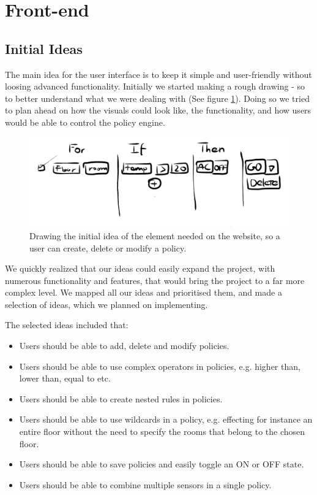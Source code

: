 \section{Front-end}
\label{sec:front-end}
\subsection{Initial Ideas}

The main idea for the user interface is to keep it simple and user-friendly without loosing advanced functionality. Initially we started making a rough drawing - so to better understand what we were dealing with (See figure \ref{fig:initial_idea_frontend}). Doing so we tried to plan ahead on how the visuals could look like, the functionality, and how users would be able to control the policy engine.

\begin{figure}[h!]
\centering
\includegraphics[width=\columnwidth]{initial_idea_frontend.png}
\caption{Drawing the initial idea of the element needed on the website, so a user can create, delete or modify a policy.}
\label{fig:initial_idea_frontend}
\end{figure}

We quickly realized that our ideas could easily expand the project, with numerous functionality and features, that would bring the project to a far more complex level.
We mapped all our ideas and prioritised them, and made a selection of ideas, which we planned on implementing.

The selected ideas included that:
\begin{itemize}
\item Users should be able to add, delete and modify policies.
\item Users should be able to use complex operators in policies, e.g. higher than, lower than, equal to etc.
\item Users should be able to create nested rules in policies.
\item Users should be able to use wildcards in a policy, e.g. effecting for instance an entire floor without the need to specify the rooms that belong to the chosen floor.
\item Users should be able to save policies and easily toggle an ON or OFF state.
\item Users should be able to combine multiple sensors in a single policy.
\end{itemize}


